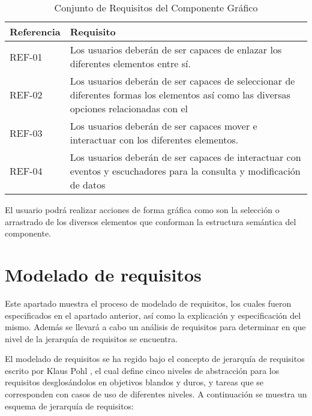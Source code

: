 	
		\begin{table}[H]
			\begin{center}
				\begin{tabular}{|l|l|}
					\hline
					Referencia & Requisito \\
					\hline \hline
					REF-01 & Los usuarios deberán de ser capaces de enlazar los diferentes elementos entre sí. \\ \hline					
					REF-02 & Los usuarios deberán de ser capaces de seleccionar de diferentes formas los elementos así como las diversas opciones relacionadas con el \\ \hline					
					REF-03 & Los usuarios deberán de ser capaces mover e interactuar con los diferentes elementos.\\ \hline
					REF-04 & Los usuarios deberán de ser capaces de interactuar con eventos y escuchadores para la consulta y modificación de datos\\ \hline
				\end{tabular}
				\caption{Conjunto de Requisitos del Componente Gráfico}
				\label{tabla:requisitosHerramientaProceso}
			\end{center}
		\end{table}
	
		\vspace{5mm}
	
		El usuario podrá realizar acciones de forma gráfica como son la selección o arrastrado de los diversos elementos que conforman la estructura semántica del componente.
	
	
		
		
		
	
	
		\section{Modelado de requisitos}
	Este apartado muestra el proceso de modelado de requisitos, los cuales fueron especificados en el apartado anterior, así como la explicación y especificación del mismo. Además se llevará a cabo un análisis de requisitos para determinar en que nivel de la jerarquía de requisitos se encuentra.
	
	\vspace{5mm}
	
	El modelado de requisitos se ha regido bajo el concepto de jerarquía de requisitos escrito por Klaus Pohl \cite{klauspohl}, el cual define cinco niveles de abstracción para los requisitos desglosándolos en objetivos blandos y duros, y tareas que se corresponden con casos de uso de diferentes niveles. A continuación se muestra un esquema de jerarquía de requisitos:
	
